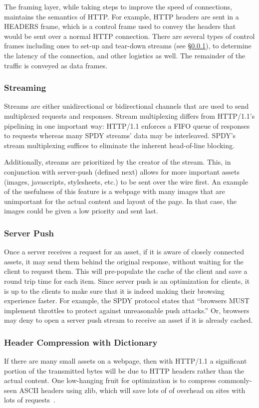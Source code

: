 \documentclass[11pt,letterpaper,notitlepage]{article}
\begin{document}
The framing layer, while taking steps to improve the speed of connections,
maintains the semantics of HTTP.  For example, HTTP headers are sent in a
HEADERS frame, which is a control frame used to convey the headers that would
be sent over a normal HTTP connection.  There are several types of control
frames including ones to set-up and tear-down streams (see
\S\ref{sec:background/spdy/streaming}), to determine the latency of the
connection, and other logistics as well.  The remainder of the traffic is
conveyed as data frames.

\subsubsection{Streaming}
\label{sec:background/spdy/streaming}
Streams are either unidirectional or bidirectional channels that are used to
send multiplexed requests and responses.  Stream multiplexing differs from
HTTP/1.1's pipelining in one important way: HTTP/1.1 enforces a FIFO queue of
responses to requests whereas many SPDY streams' data may be interleaved.
SPDY's stream multiplexing suffices to eliminate the inherent head-of-line
blocking.

Additionally, streams are prioritized by the creator of the stream.  This, in
conjunction with server-push (defined next) allows for more important assets
(images, javascripts, stylesheets, etc.) to be sent over the wire first.  An
example of the usefulness of this feature is a webpage with many images that
are unimportant for the actual content and layout of the page.  In that case,
the images could be given a low priority and sent last.

\subsubsection{Server Push}
Once a server receives a request for an asset, if it is aware
of closely connected assets, it may send them behind the original response,
without waiting for the client to request them.  This will pre-populate the
cache of the client and save a round trip time for each item. Since server push
is an optimization for clients, it is up to the clients to make sure that it is
indeed making their browsing experience faster. For example, the SPDY
protocol\cite{spdy3} states that ``browsers MUST implement throttles to
protect against unreasonable push attacks.'' Or, browsers may deny to open a
server push stream to receive an asset if it is already cached.

\subsubsection{Header Compression with Dictionary}
If there are many small assets on a webpage, then with HTTP/1.1 a significant
portion of the transmitted bytes will be due to HTTP headers rather than the
actual content. One low-hanging fruit for optimization is to compress
commonly-seen ASCII headers using zlib, which will save lots of of overhead on
sites with lots of requests~\cite{binoy}.
\end{document}
